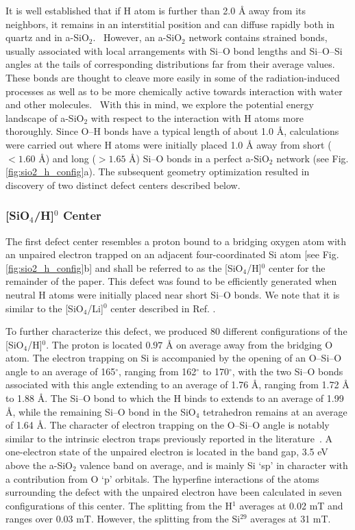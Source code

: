 \documentclass[aps,prb,reprint,superscriptaddress,showpacs]{revtex4-1}
\begin{document}
It is well established that if H atom is further than 2.0 {\AA} away from its neighbors, it remains in an interstitial position and can diffuse rapidly both in quartz and in a-SiO$_2$.~\cite{skuja_hdiffusion,godet_hydrogen,blochl_vacancies} However, an a-SiO$_2$ network contains strained bonds, usually associated with local arrangements with \mbox{Si--O} bond lengths and \mbox{Si--O--Si} angles at the tails of corresponding distributions far from their average values. These bonds are thought to cleave more easily in some of the radiation-induced processes as well as to be more chemically active towards interaction with water and other molecules.~\cite{awazu} With this in mind, we explore the potential energy landscape of a-SiO$_2$ with respect to the interaction with H atoms more thoroughly. Since \mbox{O--H} bonds have a typical length of about 1.0 {\AA}, calculations were carried out where H atoms were initially placed 1.0 {\AA} away from short ($< 1.60$ {\AA}) and long ($> 1.65$ {\AA}) \mbox{Si--O} bonds in a perfect a-SiO$_2$ network (see Fig. \ref{fig:sio2_h_config}a). The subsequent geometry optimization resulted in discovery of two distinct defect centers described below.

\subsubsection{[SiO$_4$/H]$^0$ Center}

The first defect center resembles a proton bound to a bridging oxygen atom with an unpaired electron trapped on an adjacent four-coordinated Si atom [see Fig. \ref{fig:sio2_h_config}b] and shall be referred to as the [SiO$_4$/H]$^0$ center for the remainder of the paper. This defect was found to be efficiently generated when neutral H atoms were initially placed near short \mbox{Si--O} bonds. We note that it is similar to the [SiO$_4$/Li]$^0$ center described in Ref. \cite{aelsayed_prb}. 

To further characterize this defect, we produced 80 different configurations of the [SiO$_4$/H]$^0$. The proton is located $0.97$ {\AA} on average away from the bridging O atom. The electron trapping on Si is accompanied by the opening of an \mbox{O--Si--O} angle to an average of 165$^\circ$, ranging from 162$^\circ$ to 170$^\circ$, with the two \mbox{Si--O} bonds associated with this angle extending to an average of 1.76 {\AA}, ranging from 1.72 {\AA} to 1.88 {\AA}. The \mbox{Si--O} bond to which the H binds to extends to an average of 1.99 {\AA}, while the remaining \mbox{Si--O} bond in the SiO$_4$ tetrahedron remains at an average of 1.64 {\AA}. The character of electron trapping on the \mbox{O--Si--O} angle is notably similar to the intrinsic electron traps previously reported in the literature~\cite{electron_trap_sio2,aelsayed_prb}. A one-electron state of the unpaired electron is located in the band gap, 3.5 eV above the a-SiO$_2$ valence band on average, and is mainly Si `sp' in character with a contribution from O `p' orbitals. The hyperfine interactions of the atoms surrounding the defect with the unpaired electron have been calculated in seven configurations of this center. The splitting from the H$^1$ averages at 0.02 mT and ranges over 0.03 mT. However, the splitting from the Si$^{29}$ averages at 31 mT. 
\end{document}
